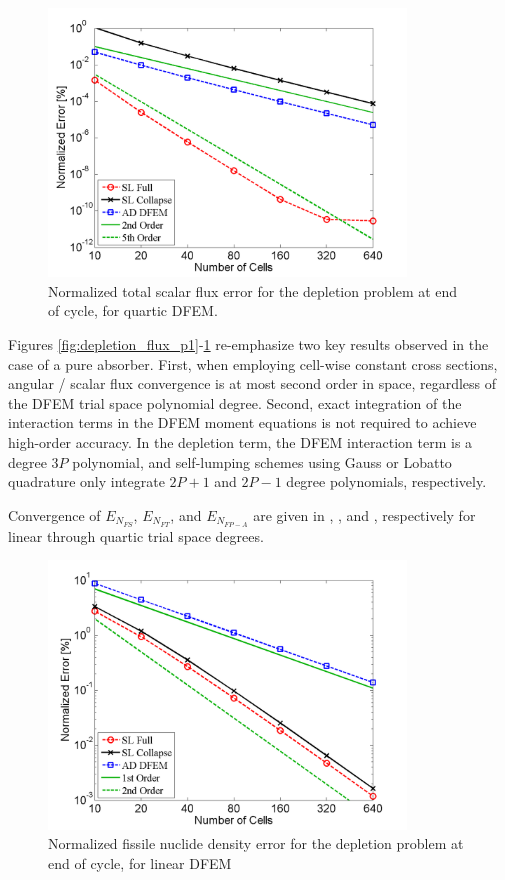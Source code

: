 \pagebreak

\begin{figure}[!htp]
\centering
\includegraphics[width=9.5cm]{chapter5_depletion/Flux_P4_norm_err.png}
\caption{Normalized total scalar flux error for the depletion problem at end of cycle, for quartic DFEM.}
\label{fig:depletion_flux_p4}
\end{figure}

Figures \ref{fig:depletion_flux_p1}-\ref{fig:depletion_flux_p4} re-emphasize two key results observed in the case of a pure absorber.
First, when employing cell-wise constant cross sections, angular / scalar flux convergence is at most second order in space, regardless of the DFEM trial space polynomial degree.
Second, exact integration of the interaction terms in the DFEM moment equations is not required to achieve high-order accuracy.
In the depletion term, the DFEM interaction term is a degree $3P$ polynomial, and self-lumping schemes using Gauss or Lobatto quadrature only integrate $2P+1$ and $2P-1$ degree polynomials, respectively.

Convergence of $E_{N_{FS}}$, $E_{N_{FT}}$, and $E_{N_{FP-A}}$ are given in 
, , and , respectively for linear through quartic trial space degrees.

\begin{figure}[!htp]
\centering
\includegraphics[width=9.5cm]{chapter5_depletion/FS_P1_norm_err.png}
\caption{Normalized fissile nuclide density error for the depletion problem at end of cycle, for linear DFEM}
\label{fig:depletion_NFS_p1}
\end{figure}

